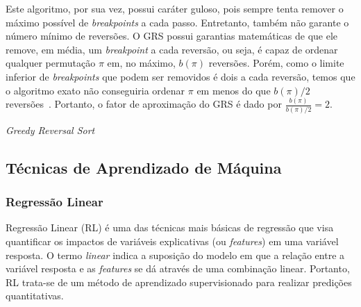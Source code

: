 \documentclass[runningheads,a4paper]{llncs}
\begin{document}
Este algoritmo, por sua vez, possui caráter guloso, pois sempre tenta remover o máximo possível de \textit{breakpoints} a cada passo. Entretanto, também não garante o número mínimo de reversões. O GRS possui garantias matemáticas de que ele remove, em média, um \textit{breakpoint} a cada reversão, ou seja, é capaz de ordenar qualquer permutação $\pi$ em, no máximo, $b(\pi)$ reversões. Porém, como o limite inferior de \textit{breakpoints} que podem ser removidos é dois a cada reversão, temos que o algoritmo exato não conseguiria ordenar $\pi$ em menos do que $b(\pi)/2$ reversões~\cite{Kececioglu}. Portanto, o fator de aproximação do GRS é dado por $\frac{b(\pi)}{b(\pi)/2}=2$.

\begin{algorithm}[ht]
\caption{\textit{Greedy Reversal Sort}}
\label{alg:greedyReversalSort}
\end{algorithm}

\subsection{Técnicas de Aprendizado de Máquina}

\subsubsection{Regressão Linear}

Regressão Linear (RL) é uma das técnicas mais básicas de regressão que visa quantificar os impactos de variáveis explicativas (ou \textit{features}) em uma variável resposta. O termo \textit{linear} indica a suposição do modelo em que a relação entre a variável resposta e as \textit{features} se dá através de uma combinação linear. Portanto, RL trata-se de um método de aprendizado supervisionado para realizar predições quantitativas.
\end{document}
